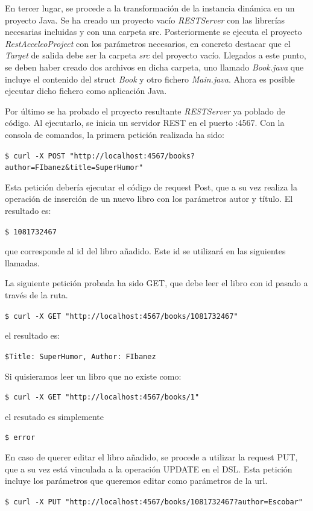 \documentclass[runningheads]{llncs}
\begin{document}
En tercer lugar, se procede a la transformación de la instancia dinámica en un proyecto Java. Se ha creado un proyecto vacío \textit{RESTServer} con las librerías necesarias incluidas y con una carpeta src. Posteriormente se ejecuta el proyecto \textit{RestAcceleoProject} con los parámetros necesarios, en concreto destacar que el \textit{Target} de salida debe ser la carpeta \textit{src} del proyecto vacío. Llegados a este punto, se deben haber creado dos archivos en dicha carpeta, uno llamado \textit{Book.java} que incluye el contenido del struct \textit{Book} y otro fichero \textit{Main.java}. Ahora es posible ejecutar dicho fichero como aplicación Java.

Por último se ha probado el proyecto resultante \textit{RESTServer} ya poblado de código. Al ejecutarlo, se inicia un servidor REST en el puerto :4567. Con la consola de comandos, la primera petición realizada ha sido:

\texttt{\$ curl -X POST "http://localhost:4567/books?author=FIbanez\&title=SuperHumor"}

Esta petición debería ejecutar el código de request Post, que a su vez realiza la operación de inserción de un nuevo libro con los parámetros autor y título. El resultado es:

\texttt{\$ 1081732467}

que corresponde al id del libro añadido. Este id se utilizará en las siguientes llamadas.

La siguiente petición probada ha sido GET, que debe leer el libro con id pasado a través de la ruta.

\texttt{\$ curl -X GET "http://localhost:4567/books/1081732467"}

el resultado es:

\texttt{\$Title: SuperHumor, Author: FIbanez}

Si quisieramos leer un libro que no existe como:

\texttt{\$ curl -X GET "http://localhost:4567/books/1"}

el resutado es simplemente

\texttt{\$ error}

En caso de querer editar el libro añadido, se procede a utilizar la request PUT, que a su vez está vinculada a la operación UPDATE en el DSL. Esta petición incluye los parámetros que queremos editar como parámetros de la url.

\texttt{\$ curl -X PUT "http://localhost:4567/books/1081732467?author=Escobar"}
\end{document}
